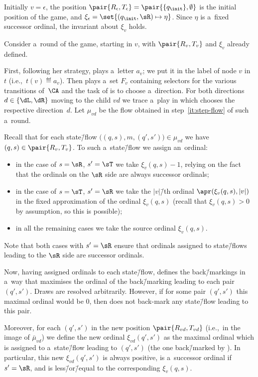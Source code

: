 \documentclass{lmcs}
\numberwithin{equation}{section}
\numberwithin{figure}{section}
\begin{document}
Initially $v=\epsilon$, the position $\pair{R_\epsilon, T_\epsilon}=\pair{\{q_\init\},\emptyset}$ is the initial position of the game, and $\xi_\epsilon=\set{(q_\init,\sR) \mapsto \eta}$.
Since $\eta$ is a~fixed successor ordinal, the invariant about $\xi_v$ holds.

Consider a~round of the game, starting in $v$, with $\pair{R_v, T_v}$ and $\xi_v$ already defined.

First, following her strategy, \eve plays a~letter $a_v$; we put it in the label of node $v$ in~$t$ (i.e.,~$t(v)\eqdef a_v$).
Then \eve plays a~set $F_v$ containing selectors for the various transitions of~$\CA$ and the task of \adam is to choose a~direction.
For both directions $d\in\{\dL,\dR\}$ moving to the child $vd$ we trace a~play in which \adam chooses the respective direction~$d$.
Let $\mu_{vd}$ be the flow obtained in step~\ref{it:step-flow} of such a~round.

Recall that for each state\=/flow $\big((q,s),m,(q',s')\big)\in\mu_{vd}$ we have $(q,s)\in\pair{R_v,T_v}$.
To such a~state\=/flow we assign an~ordinal:
\begin{itemize}
\item in the case of $s=\sR$, $s'=\sT$ we take $\xi_v(q,s)-1$, relying on the fact that the ordinals on the $\sR$ side are always successor ordinals;
\item in the case of $s=\sT$, $s'=\sR$ we take the $|v|$\=/th ordinal $\apr(\xi_v(q,s),|v|)$ in the fixed approximation of the ordinal $\xi_v(q,s)$ (recall that $\xi_v(q,s)>0$ by assumption, so this is possible);
\item in all the remaining cases we take the source ordinal $\xi_v(q,s)$.
\end{itemize}
\noindent %
Note that both cases with $s'=\sR$ ensure that ordinals assigned to state\=/flows leading to the $\sR$ side are successor ordinals.

Now, having assigned ordinals to each state\=/flow, \adam defines the back\=/markings in a~way that maximises the ordinal of the back\=/marking leading to each pair $(q',s')$.
Draws are resolved arbitrarily.
However, if for some pair $(q',s')$ this maximal ordinal would be $0$, then \adam does not back-mark any state\=/flow leading to this pair.

Moreover, for each $(q',s')$ in the new position $\pair{R_{vd},T_{vd}}$ (i.e.,~in the image of $\bar{\mu}_{vd}$)
we define the new ordinal $\xi_{vd}(q',s')$ as the maximal ordinal which is assigned to a~state\=/flow leading to $(q',s')$ (the one back\=/marked by \adam).
In particular, this new $\xi_{vd}(q',s')$ is always positive, is a~successor ordinal if $s'=\sR$, and is less\=/or\=/equal to the corresponding $\xi_v(q,s)$.
\end{document}
